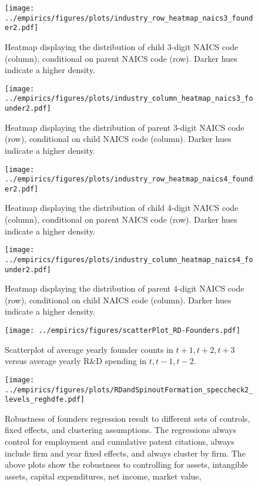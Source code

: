 \documentclass[11pt,english]{article}
\begin{document}
\begin{figure}[!htb]
	\centering
	\texttt{[image: ../empirics/figures/plots/industry\_row\_heatmap\_naics3\_founder2.pdf]}
	\caption{Heatmap displaying the distribution of child 3-digit NAICS code (column), conditional on parent NAICS code (row). Darker hues indicate a higher density.}
	\label{figure:industry_row_heatmap_naics3_founder2}
\end{figure}

\begin{figure}[!htb]
	\centering
	\texttt{[image: ../empirics/figures/plots/industry\_column\_heatmap\_naics3\_founder2.pdf]}
	\caption{Heatmap displaying the distribution of parent 3-digit NAICS code (row), conditional on child NAICS code (column). Darker hues indicate a higher density.}
	\label{figure:industry_column_heatmap_naics3_founder2}
\end{figure}

\begin{figure}[!htb]
	\centering
	\texttt{[image: ../empirics/figures/plots/industry\_row\_heatmap\_naics4\_founder2.pdf]}
	\caption{Heatmap displaying the distribution of child 4-digit NAICS code (column), conditional on parent NAICS code (row). Darker hues indicate a higher density.}
	\label{figure:industry_row_heatmap_naics4_founder2}
\end{figure}

\begin{figure}[!htb]
	\centering
	\texttt{[image: ../empirics/figures/plots/industry\_column\_heatmap\_naics4\_founder2.pdf]}
	\caption{Heatmap displaying the distribution of parent 4-digit NAICS code (row), conditional on child NAICS code (column). Darker hues indicate a higher density.}
	\label{figure:industry_column_heatmap_naics4_founder2}
\end{figure}


\begin{figure}[!htb]
	\centering
	\texttt{[image: ../empirics/figures/scatterPlot\_RD-Founders.pdf]}
	\caption{Scatterplot of average yearly founder counts in $t+1,t+2,t+3$ versus average yearly R\&D spending in $t,t-1,t-2$.}
	\label{figure:scatterPlot_RD-Founders}
\end{figure}

\begin{figure}[!htb]
	\centering
	\texttt{[image: ../empirics/figures/plots/RDandSpinoutFormation\_speccheck2\_levels\_reghdfe.pdf]}
	\caption{Robustness of founders regression result to different sets of controls, fixed effects, and clustering assumptions. The regressions always control for employment and cumulative patent citations, always include firm and year fixed effects, and always cluster by firm. The above plots show the robustness to controlling for assets, intangible assets, capital expenditures, net income, market value, }
	\label{figure:speccheck2_levels_reghdfe}
\end{figure}
\end{document}
